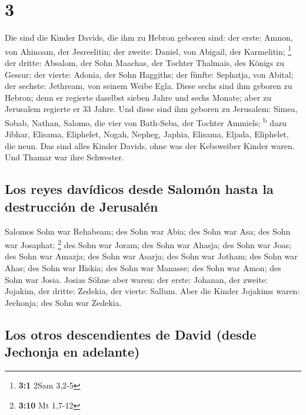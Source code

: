 \hypertarget{section-2}{%
\section{3}\label{section-2}}

 Die sind die Kinder Davids, die ihm zu Hebron geboren
sind: der erste: Amnon, von Ahinoam, der Jesreelitin; der zweite:
Daniel, von Abigail, der Karmelitin; \footnote{\textbf{3:1} 2Sam 3,2-5}
 der dritte: Absalom, der Sohn Maachas, der Tochter
Thalmais, des Königs zu Gessur; der vierte: Adonia, der Sohn Haggiths;
 der fünfte: Sephatja, von Abital; der sechste: Jethream,
von seinem Weibe Egla.  Diese sechs sind ihm geboren zu
Hebron; denn er regierte daselbst sieben Jahre und sechs Monate; aber zu
Jerusalem regierte er 33 Jahre.  Und diese sind ihm
geboren zu Jerusalem: Simea, Sobab, Nathan, Salomo, die vier von
Bath-Seba, der Tochter Ammiels; \textsuperscript{b}  dazu
Jibhar, Elisama, Eliphelet,  Nogah, Nepheg, Japhia,
 Elisama, Eljada, Eliphelet, die neun.  Das
sind alles Kinder Davids, ohne was der Kebsweiber Kinder waren. Und
Thamar war ihre Schwester.

\hypertarget{los-reyes-davuxeddicos-desde-salomuxf3n-hasta-la-destrucciuxf3n-de-jerusaluxe9n}{%
\subsection{Los reyes davídicos desde Salomón hasta la destrucción de
Jerusalén}\label{los-reyes-davuxeddicos-desde-salomuxf3n-hasta-la-destrucciuxf3n-de-jerusaluxe9n}}

 Salomos Sohn war Rehabeam; des Sohn war Abia; des Sohn
war Asa; des Sohn war Josaphat; \footnote{\textbf{3:10} Mt 1,7-12}
 des Sohn war Joram; des Sohn war Ahasja; des Sohn war
Joas;  des Sohn war Amazja; des Sohn war Asarja; des Sohn
war Jotham;  des Sohn war Ahas; des Sohn war Hiskia; des
Sohn war Manasse;  des Sohn war Amon; des Sohn war Josia.
 Josias Söhne aber waren: der erste: Johanan, der zweite:
Jojakim, der dritte: Zedekia, der vierte: Sallum.  Aber
die Kinder Jojakims waren: Jechonja; des Sohn war Zedekia.

\hypertarget{los-otros-descendientes-de-david-desde-jechonja-en-adelante}{%
\subsection{Los otros descendientes de David (desde Jechonja en
adelante)}\label{los-otros-descendientes-de-david-desde-jechonja-en-adelante}}


